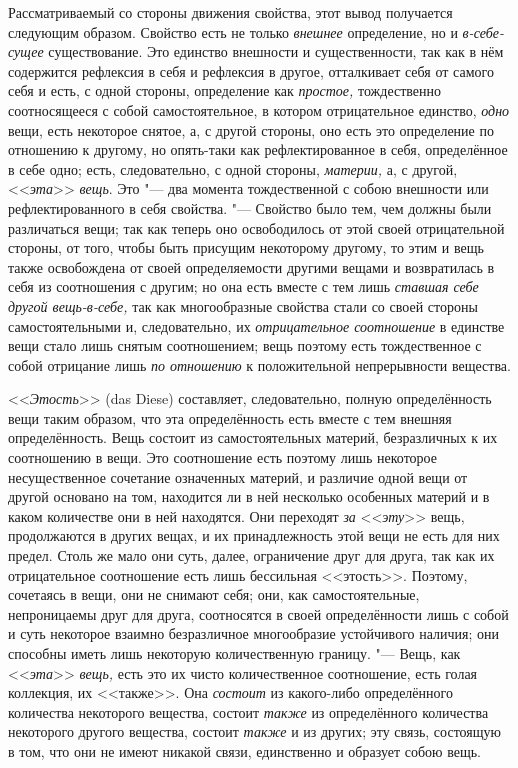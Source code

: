 Рассматриваемый со стороны движения свойства, этот вывод получается
следующим образом. Свойство есть не только {\em внешнее} определение, но и
{\em в-себе-сущее} существование. Это единство
внешности и существенности, так как в нём содержится рефлексия в себя и
рефлексия в другое, отталкивает себя от самого себя и есть, с одной
стороны, определение как {\em простое,} тождественно
соотносящееся с собой самостоятельное, в котором отрицательное единство,
{\em одно} вещи, есть некоторое снятое, а, с другой
стороны, оно есть это определение по отношению к другому, но опять-таки как
рефлектированное в себя, определённое в себе одно; есть, следовательно, с
одной стороны, {\em материи,} а, с другой,
<<{\em эта}>> {\em вещь}. Это "--- два
момента тождественной с собою внешности или рефлектированного в себя
свойства. "--- Свойство было тем, чем должны были различаться вещи; так как
теперь оно освободилось от этой своей отрицательной стороны, от того, чтобы
быть присущим некоторому другому, то этим и вещь также освобождена от своей
определяемости другими вещами и возвратилась в себя из соотношения с
другим; но она есть вместе с тем лишь {\em ставшая себе
другой вещь-в-себе,} так как многообразные свойства стали со своей стороны
самостоятельными и, следовательно, их
{\em отрицательное соотношение} в единстве вещи стало
лишь снятым соотношением; вещь поэтому есть тождественное с собой отрицание
лишь {\em по отношению} к положительной непрерывности вещества.

<<{\em Этость}>> (das Diese) составляет, следовательно,
полную определённость вещи таким образом, что эта определённость есть
вместе с тем внешняя определённость. Вещь состоит из самостоятельных
материй, безразличных к их соотношению в вещи. Это соотношение есть поэтому
лишь некоторое несущественное сочетание означенных материй, и различие
одной вещи от другой основано на том, находится ли в ней несколько
особенных материй и в каком количестве они в ней находятся. Они переходят
{\em за} <<{\em эту}>> вещь,
продолжаются в других вещах, и их принадлежность этой вещи не есть для них
предел. Столь же мало они суть, далее, ограничение друг для друга, так как
их отрицательное соотношение есть лишь бессильная <<этость>>. Поэтому,
сочетаясь в вещи, они не снимают себя; они, как самостоятельные,
непроницаемы друг для друга, соотносятся в своей определённости лишь с
собой и суть некоторое взаимно безразличное многообразие устойчивого
наличия; они способны иметь лишь некоторую количественную границу. "--- Вещь,
как <<{\em эта}>> {\em вещь,} есть
это их чисто количественное соотношение, есть голая коллекция, их <<также>>.
Она {\em состоит} из какого-либо определённого
количества некоторого вещества, состоит {\em также} из
определённого количества некоторого другого вещества, состоит
{\em также} и из других; эту связь, состоящую в том,
что они не имеют никакой связи, единственно и образует собою вещь.



